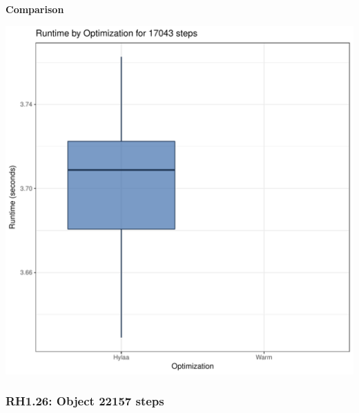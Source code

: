 \documentclass{article}\usepackage[]{graphicx}\usepackage[]{color}
\makeatletter
\def\maxwidth{ %
  \ifdim\Gin@nat@width>\linewidth
    \linewidth
  \else
    \Gin@nat@width
  \fi
}
\newenvironment{knitrout}{}{} %
\makeatother
\begin{document}
 \textbf{Comparison}
  
\begin{knitrout}
\color{fgcolor}
\includegraphics[width=\maxwidth]{figure/RH1_steps17043-1} 

\end{knitrout}


\subsubsection{RH1.26: Object 22157 steps}
\end{document}
